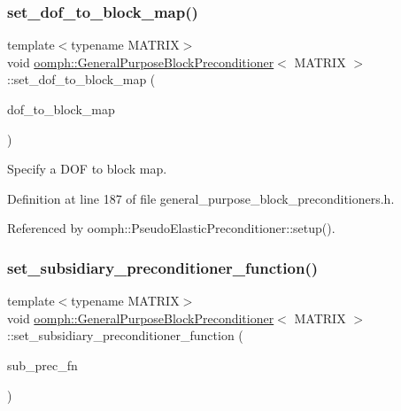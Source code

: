 \subsubsection{\texorpdfstring{set\+\_\+dof\+\_\+to\+\_\+block\+\_\+map()}{set\_dof\_to\_block\_map()}}
{\footnotesize\ttfamily template$<$typename M\+A\+T\+R\+IX$>$ \\
void \hyperlink{classoomph_1_1GeneralPurposeBlockPreconditioner}{oomph\+::\+General\+Purpose\+Block\+Preconditioner}$<$ M\+A\+T\+R\+IX $>$\+::set\+\_\+dof\+\_\+to\+\_\+block\+\_\+map (\begin{DoxyParamCaption}\item[{\hyperlink{classoomph_1_1Vector}{Vector}$<$ unsigned $>$ \&}]{dof\+\_\+to\+\_\+block\+\_\+map }\end{DoxyParamCaption})\hspace{0.3cm}{\ttfamily [inline]}}



Specify a D\+OF to block map. 



Definition at line 187 of file general\+\_\+purpose\+\_\+block\+\_\+preconditioners.\+h.



Referenced by oomph\+::\+Pseudo\+Elastic\+Preconditioner\+::setup().

\mbox{\label{classoomph_1_1GeneralPurposeBlockPreconditioner_af28361c79296ae7410b950b74754496c}} 
\subsubsection{\texorpdfstring{set\+\_\+subsidiary\+\_\+preconditioner\+\_\+function()}{set\_subsidiary\_preconditioner\_function()}}
{\footnotesize\ttfamily template$<$typename M\+A\+T\+R\+IX$>$ \\
void \hyperlink{classoomph_1_1GeneralPurposeBlockPreconditioner}{oomph\+::\+General\+Purpose\+Block\+Preconditioner}$<$ M\+A\+T\+R\+IX $>$\+::set\+\_\+subsidiary\+\_\+preconditioner\+\_\+function (\begin{DoxyParamCaption}\item[{\hyperlink{classoomph_1_1GeneralPurposeBlockPreconditioner_a4818c6bde7206cd9b5df4f8c1e3a3c34}{Subsidiary\+Preconditioner\+Fct\+Pt}}]{sub\+\_\+prec\+\_\+fn }\end{DoxyParamCaption})\hspace{0.3cm}{\ttfamily [inline]}}



